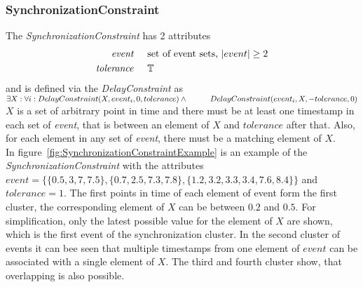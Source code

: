 	\subsubsection{SynchronizationConstraint}
		The \emph{SynchronizationConstraint} has 2 attributes
		\begin{align*}
			\emph{event} & \hspace{.5cm}\text{set of event sets, $|event|\geq 2$}\\
			\emph{tolerance} & \hspace{.5cm}\mathbb{T}
		\end{align*}
		and is defined via the \emph{DelayConstraint} as\\[10pt]
		\begin{math}
			\exists X: \forall i: DelayConstraint(X, event_i, 0, tolerance) \land\\
			\text{\hspace{1cm}}DelayConstraint(event_i, X, -tolerance, 0)
		\end{math}\\[10pt]
		$X$ is a set of arbitrary point in time and there must be at least one timestamp in each set of \emph{event}, that is between an element of $X$ and $tolerance$ after that. Also, for each element in any set of \emph{event}, there must be a matching element of $X$.\\
		In figure~\ref{fig:SynchronizationConstraintExample} is an example of the \emph{SynchronizationConstraint} with the attributes $event=\{\{0.5, 3, 7, 7.5\}, \{0.7, 2.5, 7.3, 7.8\}, \{1.2, 3.2, 3.3, 3.4, 7.6, 8.4\}\}$ and $tolerance = 1$. The first points in time of each element of event form the first cluster, the corresponding element of $X$ can be between $0.2$ and $0.5$. For simplification, only the latest possible value for the element of $X$ are shown, which is the first event of the synchronization cluster. In the second cluster of events it can bee seen that multiple timestamps from one element of $event$ can be associated with a single element of $X$. The third and fourth cluster show, that overlapping is also possible.
